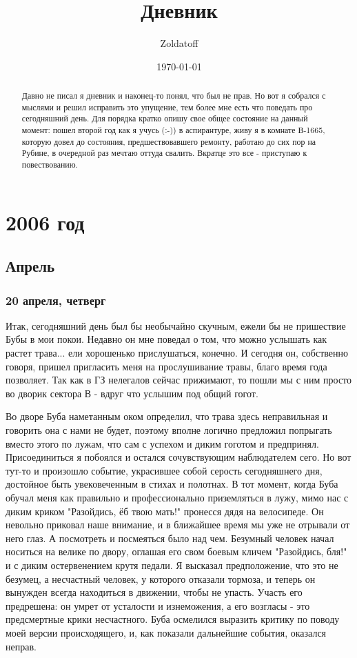\documentclass[12pt,a4paper]{article}
\newcommand{\ssubsection}[1]{
	\subsubsection*{#1}
	\addcontentsline{toc}{subsubsection}{#1}
}
\begin{document}
\author{Zoldatoff}
\title{Дневник}
\date{\today}
\maketitle
\tableofcontents
\begin{abstract}
Давно не писал я дневник и наконец-то понял, что был не прав. Но вот я собрался с мыслями и решил исправить это упущение, тем более мне есть что поведать про сегодняшний день. Для порядка кратко опишу свое общее состояние на данный момент: пошел второй год как я учусь (:-)) в аспирантуре, живу я в комнате В-1665, которую довел до состояния, предшествовавшего ремонту, работаю до сих пор на Рубине, в очередной раз мечтаю оттуда свалить. Вкратце это все - приступаю к повествованию.
\end{abstract}

\section*{2006 год}

\subsection*{Апрель}

\ssubsection{20 апреля, четверг}
Итак, сегодняшний день был бы необычайно скучным, ежели бы не пришествие Бубы в мои покои. Недавно он мне поведал о том, что можно услышать как растет трава... ели хорошенько прислушаться, конечно. И сегодня он, собственно говоря, пришел пригласить меня на прослушивание травы, благо время года позволяет. Так как в ГЗ нелегалов сейчас прижимают, то пошли мы с ним просто во дворик сектора В - вдруг что услышим под общий гогот.

Во дворе Буба наметанным оком определил, что трава здесь неправильная и говорить она с нами не будет, поэтому вполне логично предложил попрыгать вместо этого по лужам, что сам с успехом и диким гоготом и предпринял. Присоединиться я побоялся и остался сочувствующим наблюдателем сего. Но вот тут-то и произошло событие, украсившее собой серость сегодняшнего дня, достойное быть увековеченным в стихах и полотнах. В тот момент, когда Буба обучал меня как правильно и профессионально приземляться в лужу, мимо нас с диким криком "Разойдись, ёб твою мать!" пронесся дядя на велосипеде. Он невольно приковал наше внимание, и в ближайшее время мы уже не отрывали от него глаз. А посмотреть и посмеяться было над чем. Безумный человек начал носиться на велике по двору, оглашая его свом боевым кличем "Разойдись, бля!" и с диким остервенением крутя педали. Я высказал предположение, что это не безумец, а несчастный человек, у которого отказали тормоза, и теперь он вынужден всегда находиться в движении, чтобы не упасть. Участь его предрешена: он умрет от усталости и изнеможения, а его возгласы - это предсмертные крики несчастного. Буба осмелился выразить критику по поводу моей версии происходящего, и, как показали дальнейшие события, оказался неправ.
\end{document}
